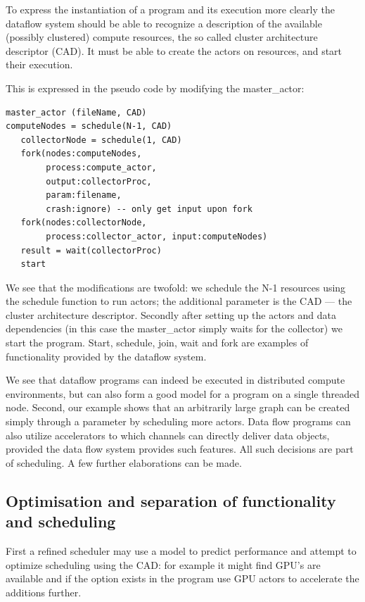 \documentclass[11pt,a4paper]{article}
\begin{document}
To express the instantiation of a program and its execution more
clearly the dataflow system should be able to recognize a description
of the available (possibly clustered) compute resources, the so called
cluster architecture descriptor (CAD).  It must be able to create the
actors on resources, and start their execution.  


\begin{Example}

This is expressed in
the pseudo code by modifying the master\_actor:

\begin{lstlisting}
master_actor (fileName, CAD)
computeNodes = schedule(N-1, CAD)
   collectorNode = schedule(1, CAD)
   fork(nodes:computeNodes, 
        process:compute_actor, 
        output:collectorProc, 
        param:filename, 
        crash:ignore) -- only get input upon fork
   fork(nodes:collectorNode, 
        process:collector_actor, input:computeNodes)
   result = wait(collectorProc)
   start
\end{lstlisting}

We see that the modifications are twofold: we schedule the N-1
resources using the schedule function to run actors; the additional
parameter is the CAD --- the cluster architecture descriptor.
Secondly after setting up the actors and data dependencies (in this
case the master\_actor simply waits for the collector) we start the
program.  Start, schedule, join, wait and fork are examples of
functionality provided by the dataflow system.

\end{Example}

We see that dataflow programs can indeed be executed in distributed
compute environments, but can also form a good model for a program on
a single threaded node.  Second, our example shows that an arbitrarily
large graph can be created simply through a parameter by scheduling
more actors.  Data flow programs can also utilize accelerators to
which channels can directly deliver data objects, provided the data
flow system provides such features.  All such decisions are part of
scheduling.  A few further elaborations can be made.

\subsection{Optimisation and separation of functionality and scheduling}

First a refined scheduler may use a model to predict performance and attempt to optimize scheduling using the CAD: for example it might find GPU’s are available and if the option exists in the program use GPU actors to accelerate the additions further.    
\end{document}
